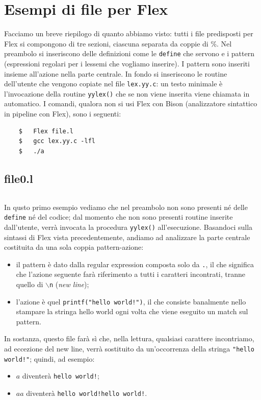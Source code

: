 \documentclass[class=book, crop=false, oneside, 12pt]{standalone}
\begin{document}
\section{Esempi di file per Flex}
Facciamo un breve riepilogo di quanto abbiamo visto: tutti i file predisposti per Flex si compongono di  tre sezioni, ciascuna separata da coppie di \%. Nel preambolo si inseriscono delle definizioni come le \texttt{define} che servono e i pattern (espressioni regolari per i lessemi che vogliamo inserire). I pattern sono inseriti insieme all'azione nella parte centrale. In fondo si inseriscono le routine dell'utente che vengono copiate nel file \texttt{lex.yy.c}: un testo minimale è l'invocazione della routine \texttt{yylex()} che se non viene inserita viene chiamata in automatico. I comandi, qualora non si usi Flex con Bison (analizzatore sintattico in pipeline con Flex), sono i seguenti:
\begin{verbatim}
    $   Flex file.l
    $   gcc lex.yy.c -lfl
    $   ./a
\end{verbatim}

\subsection*{file0.l}

\inputminted[linenos, breaklines, tabsize = 2]{c}{assets/code-fragments/file0.l}

In qusto primo esempio vediamo che nel preambolo non sono presenti né delle \texttt{define} né del codice; dal momento che non sono presenti routine inserite dall'utente, verrà invocata la procedura \texttt{yylex()} all'esecuzione. Basandoci sulla sintassi di Flex vista precedentemente, andiamo ad analizzare la parte centrale costituita da una sola coppia pattern-azione:
\begin{itemize}
    \item il pattern è dato dalla regular expression composta solo da \texttt{.}, il che significa che l'azione seguente farà riferimento a tutti i caratteri incontrati, tranne quello di \texttt{\(\backslash\)n} (\emph{new line});
    \item l'azione è quel \texttt{printf("hello world!")}, il che consiste banalmente nello stampare la stringa hello world ogni volta che viene eseguito un match sul pattern.
\end{itemize}
In sostanza, questo file farà sì che, nella lettura, qualsiasi carattere incontriamo, ad eccezione del new line, verrà sostituito da un'occorrenza della stringa \texttt{"hello world!"}; quindi, ad esempio:
\begin{itemize}
    \item \(a\) diventerà \texttt{hello world!};
    \item \(aa\) diventerà \texttt{hello world!hello world!}.
\end{itemize}
\end{document}
